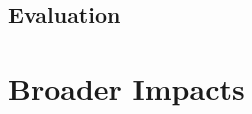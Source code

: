 \documentclass[12pt, titlepage]{article}
\begin{document}
\subsection*{Evaluation}


\section*{Broader Impacts}  

\end{document}
